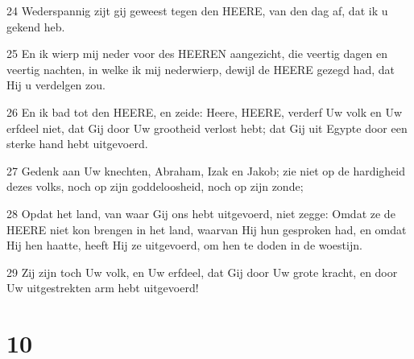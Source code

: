 \par 24 Wederspannig zijt gij geweest tegen den HEERE, van den dag af, dat ik u gekend heb.
\par 25 En ik wierp mij neder voor des HEEREN aangezicht, die veertig dagen en veertig nachten, in welke ik mij nederwierp, dewijl de HEERE gezegd had, dat Hij u verdelgen zou.
\par 26 En ik bad tot den HEERE, en zeide: Heere, HEERE, verderf Uw volk en Uw erfdeel niet, dat Gij door Uw grootheid verlost hebt; dat Gij uit Egypte door een sterke hand hebt uitgevoerd.
\par 27 Gedenk aan Uw knechten, Abraham, Izak en Jakob; zie niet op de hardigheid dezes volks, noch op zijn goddeloosheid, noch op zijn zonde;
\par 28 Opdat het land, van waar Gij ons hebt uitgevoerd, niet zegge: Omdat ze de HEERE niet kon brengen in het land, waarvan Hij hun gesproken had, en omdat Hij hen haatte, heeft Hij ze uitgevoerd, om hen te doden in de woestijn.
\par 29 Zij zijn toch Uw volk, en Uw erfdeel, dat Gij door Uw grote kracht, en door Uw uitgestrekten arm hebt uitgevoerd!

\chapter{10}

